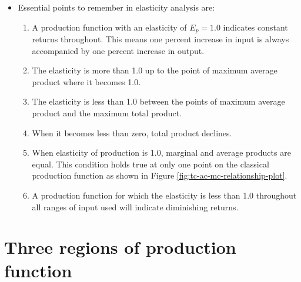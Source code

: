 \documentclass[12pt,ignorenonframetext,aspectratio=169]{beamer}
\providecommand{\tightlist}{%
  \setlength{\itemsep}{0pt}\setlength{\parskip}{0pt}}
\begin{document}
\begin{frame}{}
\protect\hypertarget{section-11}{}
\begin{itemize}
\tightlist
\item
  Essential points to remember in elasticity analysis are:

  \begin{enumerate}
  \tightlist
  \item
    A production function with an elasticity of \(E_p = 1.0\) indicates
    constant returns throughout. This means one percent increase in
    input is always accompanied by one percent increase in output.
  \item
    The elasticity is more than 1.0 up to the point of maximum average
    product where it becomes 1.0.
  \item
    The elasticity is less than 1.0 between the points of maximum
    average product and the maximum total product.
  \item
    When it becomes less than zero, total product declines.
  \item
    When elasticity of production is 1.0, marginal and average products
    are equal. This condition holds true at only one point on the
    classical production function as shown in Figure
    \ref{fig:tc-ac-mc-relationship-plot}.
  \item
    A production function for which the elasticity is less than 1.0
    throughout all ranges of input used will indicate diminishing
    returns.
  \end{enumerate}
\end{itemize}
\end{frame}

\hypertarget{three-regions-of-production-function}{%
\section{Three regions of production
function}\label{three-regions-of-production-function}}
\end{document}

